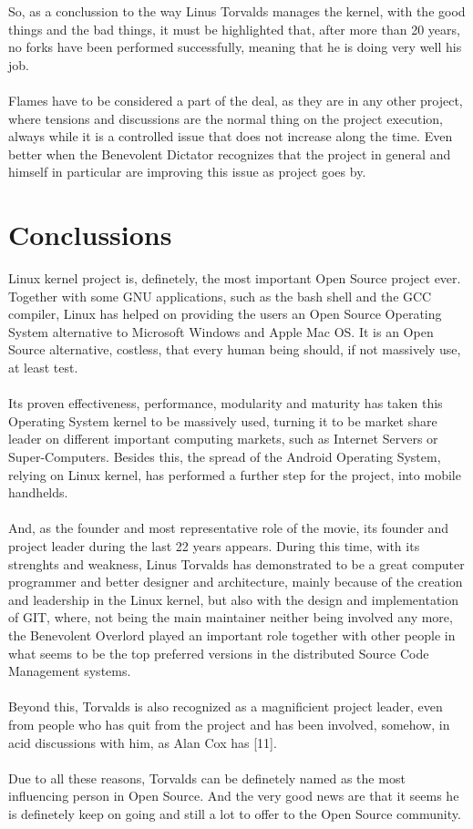 \documentclass[11pt]{article}
\begin{document}
So, as a conclussion to the way Linus Torvalds manages the kernel, with the good things and the bad things, it must be highlighted that, after more than 20 years, no forks have been performed successfully, meaning that he is doing very well his job.\\
\\Flames have to be considered a part of the deal, as they are in any other project, where tensions and discussions are the normal thing on the project execution, always while it is a controlled issue that does not increase along the time. Even better when the Benevolent Dictator recognizes that the project in general and himself in particular are improving this issue as project goes by.

\pagebreak

\section{Conclussions}
Linux kernel project is, definetely, the most important Open Source project ever. Together with some GNU applications, such as the bash shell and the GCC compiler, Linux has helped on providing the users an Open Source Operating System alternative to Microsoft Windows and Apple Mac OS. It is an Open Source alternative, costless, that every human being should, if not massively use, at least test.\\
\\
Its proven effectiveness, performance, modularity and maturity has taken this Operating System kernel to be massively used, turning it to be market share leader on different important computing markets, such as Internet Servers or Super-Computers. Besides this, the spread of the Android Operating System, relying on Linux kernel, has performed a further step for the project, into mobile handhelds.\\
\\
And, as the founder and most representative role of the movie, its founder and project leader during the last 22 years appears. During this time, with its strenghts and weakness, Linus Torvalds has demonstrated to be a great computer programmer and better designer and architecture, mainly because of the creation and leadership in the Linux kernel, but also with the design and implementation of GIT, where, not being the main maintainer neither being involved any more, the Benevolent Overlord played an important role together with other people in what seems to be the top preferred versions in the distributed Source Code Management systems.\\
\\
Beyond this, Torvalds is also recognized as a magnificient project leader, even from people who has quit from the project and has been involved, somehow, in acid discussions with him, as Alan Cox has [11].\\
\\
Due to all these reasons, Torvalds can be definetely named as the most influencing person in Open Source. And the very good news are that it seems he is definetely keep on going and still a lot to offer to the Open Source community.
\end{document}
